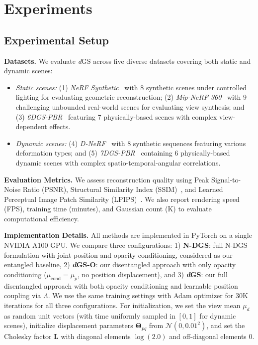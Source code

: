 \documentclass{article}
\newcommand{\modelname}{\textit{d}GS}
\theoremstyle{plain}
\theoremstyle{definition}
\theoremstyle{remark}
\begin{document}
\section{Experiments}

\subsection{Experimental Setup}

\textbf{Datasets.}
We evaluate \modelname{} across five diverse datasets covering both static and dynamic scenes:
\vspace{-1em}
\begin{itemize}[leftmargin=*]
    \item \textit{Static scenes:} (1) \textit{NeRF Synthetic}~\cite{mildenhall2021nerf} with 8 synthetic scenes under controlled lighting for evaluating geometric reconstruction; (2) \textit{Mip-NeRF 360}~\cite{barron2021mipnerf} with 9 challenging unbounded real-world scenes for evaluating view synthesis; and (3) \textit{6DGS-PBR}~\cite{gao20246dgs} featuring 7 physically-based scenes with complex view-dependent effects.

    \item \textit{Dynamic scenes:} (4) \textit{D-NeRF}~\cite{pumarola2020dnerfneuralradiancefields} with 8 synthetic sequences featuring various deformation types; and (5) \textit{7DGS-PBR}~\cite{gao20257dgs} containing 6 physically-based dynamic scenes with complex spatio-temporal-angular correlations.
\end{itemize}


\textbf{Evaluation Metrics.}
We assess reconstruction quality using Peak Signal-to-Noise Ratio (PSNR), Structural Similarity Index (SSIM)~\cite{wang2004image}, and Learned Perceptual Image Patch Similarity (LPIPS)~\cite{zhang2018perceptual}. We also report rendering speed (FPS), training time (minutes), and Gaussian count (K) to evaluate computational efficiency.

\textbf{Implementation Details.}
All methods are implemented in PyTorch on a single NVIDIA A100 GPU. We compare three configurations: 1) \textbf{N-DGS}: full N-DGS formulation with joint position and opacity conditioning, considered as our entangled baseline, 2) \textbf{\textit{d}GS-O}: our disentangled approach with only opacity conditioning ($\mu_{\text{cond}} = \mu_p$, no position displacement), and 3) \textbf{\textit{d}GS}: our full disentangled approach with both opacity conditioning and learnable position coupling via $\Lambda$. We use the same training settings with Adam optimizer for 30K iterations for all three configurations. For initialization, we set the view mean $\mu_d$ as random unit vectors (with time uniformly sampled in $[0, 1]$ for dynamic scenes), initialize displacement parameters $\boldsymbol{\Theta}_{pq}$ from $\mathcal{N}(0, 0.01^2)$, and set the Cholesky factor $\mathbf{L}$ with diagonal elements $\log(2.0)$ and off-diagonal elements 0.
\end{document}
